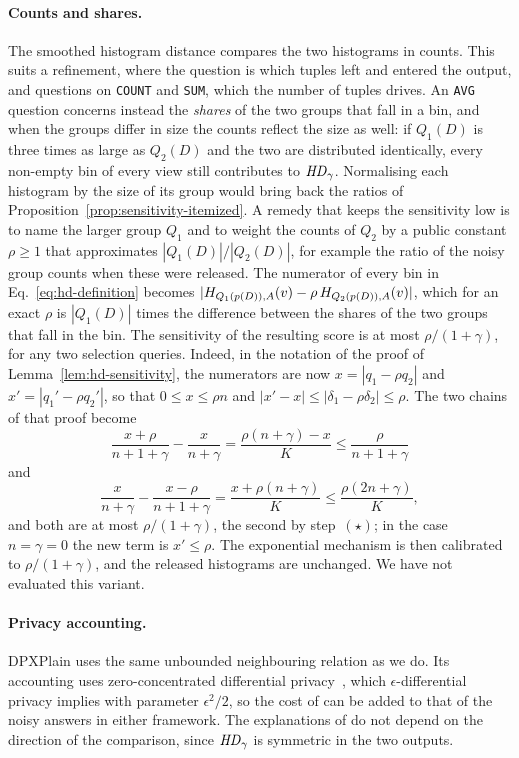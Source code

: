 \paragraph{Counts and shares.}
The smoothed histogram distance compares the two histograms in counts.
This suits a refinement, where the question is which tuples left and entered the output, and questions on \texttt{COUNT} and \texttt{SUM}, which the number of tuples drives.
An \texttt{AVG} question concerns instead the \emph{shares} of the two groups that fall in a bin, and when the groups differ in size the counts reflect the size as well: if $Q_1(D)$ is three times as large as $Q_2(D)$ and the two are distributed identically, every non-empty bin of every view still contributes to $\mathit{HD}_\gamma$.
Normalising each histogram by the size of its group would bring back the ratios of Proposition~\ref{prop:sensitivity-itemized}.
A remedy that keeps the sensitivity low is to name the larger group $Q_1$ and to weight the counts of $Q_2$ by a public constant $\rho\ge1$ that approximates $|Q_1(D)|/|Q_2(D)|$, for example the ratio of the noisy group counts when these were released.
The numerator of every bin in Eq.~\eqref{eq:hd-definition} becomes $|H_{Q_1(p(D)),A}(v)-\rho\,H_{Q_2(p(D)),A}(v)|$, which for an exact $\rho$ is $|Q_1(D)|$ times the difference between the shares of the two groups that fall in the bin.
The sensitivity of the resulting score is at most $\rho/(1+\gamma)$, for any two selection queries.
Indeed, in the notation of the proof of Lemma~\ref{lem:hd-sensitivity}, the numerators are now $x=|q_1-\rho q_2|$ and $x'=|q_1'-\rho q_2'|$, so that $0\le x\le\rho n$ and $|x'-x|\le|\delta_1-\rho\delta_2|\le\rho$.
The two chains of that proof become
\[
\frac{x+\rho}{n+1+\gamma}-\frac{x}{n+\gamma}=\frac{\rho(n+\gamma)-x}{K}\le\frac{\rho}{n+1+\gamma}
\]
and
\[
\frac{x}{n+\gamma}-\frac{x-\rho}{n+1+\gamma}=\frac{x+\rho(n+\gamma)}{K}\le\frac{\rho(2n+\gamma)}{K} ,
\]
and both are at most $\rho/(1+\gamma)$, the second by step~$(\star)$; in the case $n=\gamma=0$ the new term is $x'\le\rho$.
The exponential mechanism is then calibrated to $\rho/(1+\gamma)$, and the released histograms are unchanged.
We have not evaluated this variant.

\paragraph{Privacy accounting.}
DPXPlain uses the same unbounded neighbouring relation as we do.
Its accounting uses zero-concentrated differential privacy~\cite{bun2016}, which $\epsilon$-differential privacy implies with parameter $\epsilon^2/2$, so the cost of \sys{} can be added to that of the noisy answers in either framework.
The explanations of \sys{} do not depend on the direction of the comparison, since $\mathit{HD}_\gamma$ is symmetric in the two outputs.

